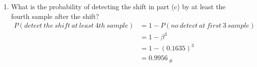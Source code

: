 \begin{enumerate}
    \item What is the probability of detecting the shift in part (c) by at least the fourth sample after the shift?
        \begin{align*}
            P\left(detect \ the \ shift \ at \ least \ 4th \ sample \right) &= 1 - P\left(no \ detect \ at \ first \ 3 \ sample \right)\\
            &= 1 - \beta^3\\
            &= 1 - (0.1635)^3\\
            &= 0.9956_{\ \#}
        \end{align*}
        
\end{enumerate}